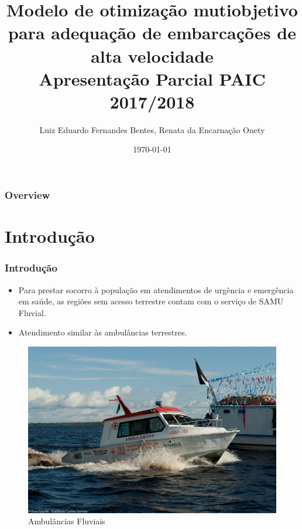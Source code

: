 \documentclass{beamer}
\title[ ]{\textbf{Modelo de otimização mutiobjetivo para adequação de embarcações de alta velocidade}\\Apresentação Parcial PAIC 2017/2018} %
\author[L.E.F.B]{Luiz Eduardo Fernandes Bentes, Renata da Encarnação Onety} %
\institute[UEA] %
{
Universidade do Estado do Amazonas \\ Escola Superior de Tecnologia -- EST\\ Manaus - Amazonas - Brasil\\ %
\medskip
\textit{\{lefb.eng,ronety\} @uea.edu.br} %
}
\date{\today} %
\begin{document}
\begin{frame}
\titlepage %
\end{frame}

\begin{frame}
\frametitle{Overview}
\tableofcontents
\end{frame}

\section{Introdução} 
\begin{frame}
 \tableofcontents[ 
    currentsubsection, 
    hideothersubsections, 
    sectionstyle=show/shaded
    ] 
\end{frame}
\begin{frame}
\frametitle{Introdução}
\begin{itemize}
	\item Para prestar socorro à população em atendimentos de urgência e emergência em saúde, as regiões sem acesso terrestre contam com o serviço de SAMU Fluvial.
	\item Atendimento similar às ambulâncias terrestres.
\end{itemize}

\begin{figure}[h]
	\centering
	\includegraphics[scale=0.7]{samu17}
	\caption{Ambulâncias Fluviais}
	\label{fig:ambulancha}
\end{figure}

\end{frame}
\end{document}
